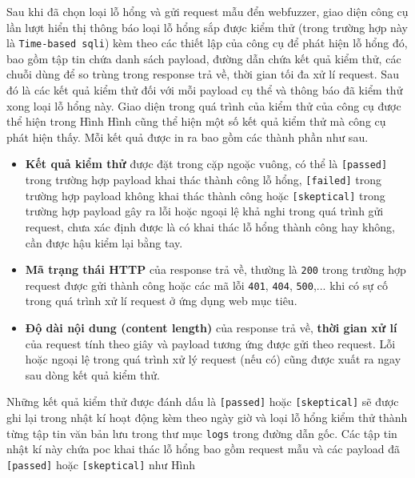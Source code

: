 Sau khi đã chọn loại lỗ hổng và gửi request mẫu đển webfuzzer, giao diện công cụ lần lượt hiển thị thông báo loại lỗ hổng sắp được kiểm thử (trong trường hợp này là \texttt{Time-based \acrshort{sqli}}) kèm theo các thiết lập của công cụ để phát hiện lỗ hổng đó, bao gồm tập tin chứa danh sách payload, đường dẫn chứa kết quả kiểm thử, các chuỗi dùng để so trùng trong response trả về, thời gian tối đa xử lí request. Sau đó là các kết quả kiểm thử đối với mỗi payload cụ thể và thông báo đã kiểm thử xong loại lỗ hổng này. Giao diện trong quá trình của kiểm thử của công cụ được thể hiện trong Hình 
Hình cũng thể hiện một số kết quả kiểm thử mà công cụ phát hiện thấy. Mỗi kết quả được in ra bao gồm các thành phần như sau.
\begin{itemize}
    \item \textbf{Kết quả kiểm thử} được đặt trong cặp ngoặc vuông, có thể là \texttt{[passed]} trong trường hợp payload khai thác thành công lỗ hổng, \texttt{[failed]} trong trường hợp payload không khai thác thành công hoặc \texttt{[skeptical]} trong trường hợp payload gây ra lỗi hoặc ngoại lệ khả nghi trong quá trình gửi request, chưa xác định được là có khai thác lỗ hổng thành công hay không, cần được hậu kiểm lại bằng tay.
    \item \textbf{Mã trạng thái HTTP} của response trả về, thường là \texttt{200} trong trường hợp request được gửi thành công hoặc các mã lỗi \texttt{401}, \texttt{404}, \texttt{500},... khi có sự cố trong quá trình xử lí request ở ứng dụng web mục tiêu.
    \item \textbf{Độ dài nội dung (content length)} của response trả về, \textbf{thời gian xử lí} của request tính theo giây và payload tương ứng được gửi theo request. Lỗi hoặc ngoại lệ trong quá trình xử lý request (nếu có) cũng được xuất ra ngay sau dòng kết quả kiểm thử.
\end{itemize}
Những kết quả kiểm thử được đánh dấu là \texttt{[passed]} hoặc \texttt{[skeptical]} sẽ được ghi lại trong nhật kí hoạt động kèm theo ngày giờ và loại lỗ hổng kiểm thử thành từng tập tin văn bản lưu trong thư mục \texttt{logs} trong đường dẫn gốc. Các tập tin nhật kí này chứa \acrshort{poc} khai thác lỗ hổng bao gồm request mẫu và các payload đã \texttt{[passed]} hoặc \texttt{[skeptical]} như Hình 
